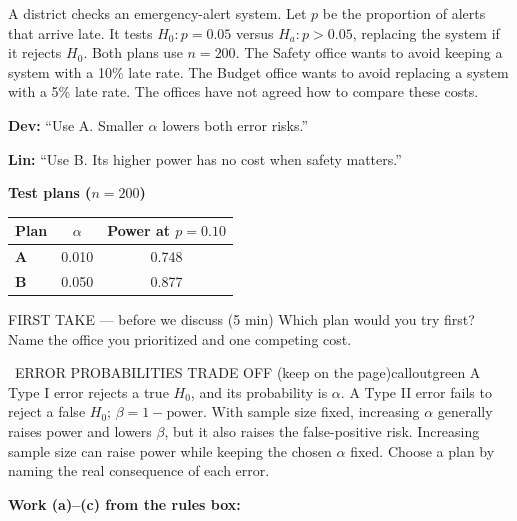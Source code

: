 \documentclass[11pt]{article}
\begin{document}


A district checks an emergency-alert system. Let $p$ be the proportion of alerts that arrive late. It tests $H_0:p=0.05$ versus $H_a:p>0.05$, replacing the system if it rejects $H_0$. Both plans use $n=200$. The Safety office wants to avoid keeping a system with a 10\% late rate. The Budget office wants to avoid replacing a system with a 5\% late rate. The offices have not agreed how to compare these costs.\par\smallskip \textbf{Dev:} ``Use A. Smaller $\alpha$ lowers both error risks.''\par \textbf{Lin:} ``Use B. Its higher power has no cost when safety matters.''\par
\begin{center}
\textbf{Test plans ($n=200$)}\par\smallskip
\begin{tabular}{|l|c|c|}
\hline
\textbf{Plan} & \textbf{$\alpha$} & \textbf{Power at $p=0.10$} \\ \hline
\textbf{A} & 0.010 & 0.748 \\ \hline
\textbf{B} & 0.050 & 0.877 \\ \hline
\end{tabular}
\end{center}
\begin{firsttakebox}{FIRST TAKE --- before we discuss (5 min)}
Which plan would you try first? Name the office you prioritized and one competing cost.
\workspace{0.9in}
\end{firsttakebox}

\begin{callout}{\IconBook\ ERROR PROBABILITIES TRADE OFF (keep on the page)}{calloutgreen}
A Type I error rejects a true $H_0$, and its probability is $\alpha$. A Type II error fails to reject a false
$H_0$; $\beta=1-\text{power}$. With sample size fixed, increasing $\alpha$ generally raises power and lowers
$\beta$, but it also raises the false-positive risk. Increasing sample size can raise power while keeping the
chosen $\alpha$ fixed. Choose a plan by naming the real consequence of each error.
\end{callout}

\newpage
\textbf{Work (a)--(c) from the rules box:}\par\smallskip
\end{document}
